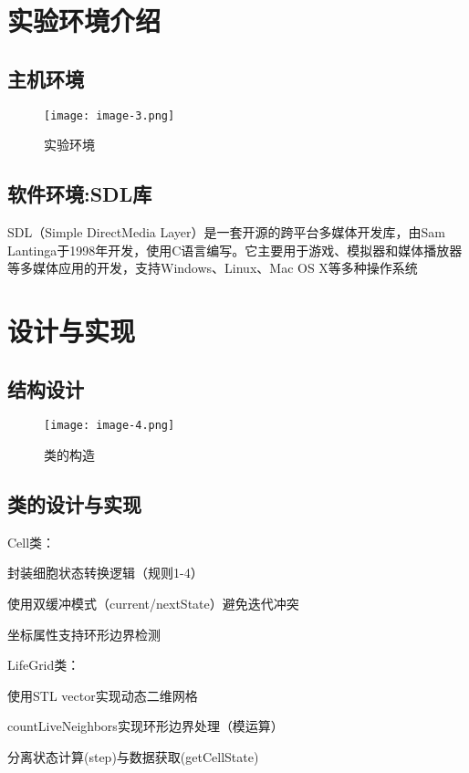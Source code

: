 \documentclass[forprint]{WHUBachelor}
\begin{document}

\chapter{实验环境介绍}
\section{主机环境}
\begin{figure}[h]
    \centering
    \texttt{[image: image-3.png]}
    \caption{实验环境}
    \label{fig:gui}
\end{figure}

\section{软件环境:SDL库}
SDL（Simple DirectMedia Layer）是一套开源的跨平台多媒体开发库，由Sam Lantinga于1998年开发，使用C语言编写。它主要用于游戏、模拟器和媒体播放器等多媒体应用的开发，支持Windows、Linux、Mac OS X等多种操作系统



\chapter{设计与实现}

\section{结构设计}
\begin{figure}[h]
    \centering
    \texttt{[image: image-4.png]}
    \caption{类的构造}
    \label{fig:gui}
\end{figure}
\section{类的设计与实现}
Cell类：

封装细胞状态转换逻辑（规则1-4）

使用双缓冲模式（current/nextState）避免迭代冲突

坐标属性支持环形边界检测  

LifeGrid类：

使用STL vector实现动态二维网格

countLiveNeighbors实现环形边界处理（模运算）

分离状态计算(step)与数据获取(getCellState)  
\end{document}
